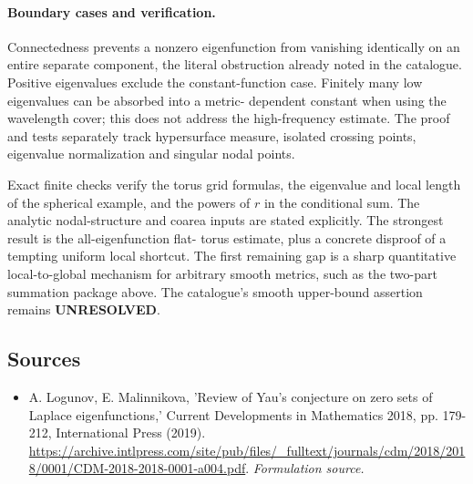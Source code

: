 \documentclass[11pt]{article}
\begin{document}
\paragraph{Boundary cases and verification.}
Connectedness prevents a nonzero eigenfunction from vanishing identically
on an entire separate component, the literal obstruction already noted
in the catalogue. Positive eigenvalues exclude the constant-function
case. Finitely many low eigenvalues can be absorbed into a metric-
dependent constant when using the wavelength cover; this does not
address the high-frequency estimate. The proof and tests separately
track hypersurface measure, isolated crossing points, eigenvalue
normalization and singular nodal points.

Exact finite checks verify the torus grid formulas, the eigenvalue and
local length of the spherical example, and the powers of $r$ in the
conditional sum. The analytic nodal-structure and coarea inputs are
stated explicitly. The strongest result is the all-eigenfunction flat-
torus estimate, plus a concrete disproof of a tempting uniform local
shortcut. The first remaining gap is a sharp quantitative local-to-global
mechanism for arbitrary smooth metrics, such as the two-part summation
package above. The catalogue's smooth upper-bound assertion remains
\textbf{UNRESOLVED}.

\subsection{Sources}
\begin{itemize}
\item[S1]A. Logunov, E. Malinnikova, 'Review of Yau's conjecture on zero sets of Laplace eigenfunctions,' Current Developments in Mathematics 2018, pp. 179-212, International Press (2019).
\url{https://archive.intlpress.com/site/pub/files/_fulltext/journals/cdm/2018/2018/0001/CDM-2018-2018-0001-a004.pdf}.
\textit{Formulation source.}
\end{itemize}
\end{document}
